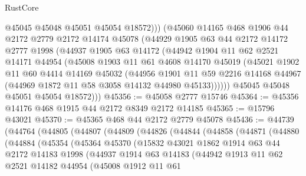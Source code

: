 \begin{lexlean}{RustCore}
\begin{coremodule}
            @45045
            @45048
            @45051
            @45054
            @18572)))
      (@45060
        @14165
        @468
        @1906
        @44
        @2172
        @2779
        @2172
        @14174
        @45078
        (@44929
          @1905
          @63
          @44
          @2172
          @14172
          @2777
          @1998
          (@44937
            @1905
            @63
            @14172
            (@44942
              @1904
              @11
              @62
              @2521
              @14171
              @44954
              (@45008
                @1903
                @11
                @61
                @4608
                @14170
                @45019
                (@45021
                  @1902
                  @11
                  @60
                  @4414
                  @14169
                  @45032
                  (@44956
                    @1901
                    @11
                    @59
                    @2216
                    @14168
                    @44967
                    (@44969 @1872 @11 @58 @3058 @14132 @44980 @45133))))))
          @45045
          @45048
          @45051
          @45054
          @18572)))
@45356 := @45058 @2777 @15746
@45364 := @45356 @14176 @468 @1915 @44 @2172 @8349 @2172 @14185
@45365 := @15796 @43021
@45370 := @45365 @468 @44 @2172 @2779 @45078
@45436 := @44739
    (@44764
      (@44805
        (@44807
          (@44809
            (@44826
              (@44844
                (@44858
                  (@44871
                    (@44880
                      (@44884
                        (@45354
                          (@45364
                            @45370
                            (@15832
                              @43021
                              @1862
                              @1914
                              @63
                              @44
                              @2172
                              @14183
                              @1998
                              (@44937
                                @1914
                                @63
                                @14183
                                (@44942
                                  @1913
                                  @11
                                  @62
                                  @2521
                                  @14182
                                  @44954
                                  (@45008
                                    @1912
                                    @11
                                    @61

\end{coremodule}
\end{lexlean}
